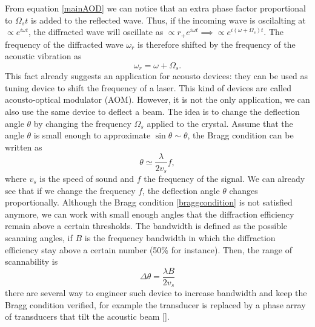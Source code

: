 From equation \eqref{mainAOD} we can notice that an extra phase factor proportional to $\Omega_s t$ is added to the reflected wave. Thus, if the incoming wave is oscilalting at $\propto e^{i\omega t}$, the diffracted wave will oscillate as $\propto r_{+}e^{i\omega t} \implies \propto e^{i(\omega + \Omega_s )t}$. The frequency of the diffracted wave $\omega_r$ is therefore shifted by the frequency of the acoustic vibration as
\begin{equation}
\omega_r  =  \omega + \Omega_s.
\end{equation}
This fact already suggests an application for acousto devices: they can be used as tuning device to shift the frequency of a laser. This kind of devices are called acousto-optical modulator (AOM). However, it is not the only application, we can also use the same device to deflect a beam. The idea is to change the deflection angle $\theta$ by changing the frequency $\Omega_s$ applied to the crystal.
Assume that the angle $\theta$ is small enough to approximate $\sin\theta \sim \theta$, the Bragg condition can be written as
\begin{equation}
\theta \simeq \frac{\lambda}{2 v_s}f,
\end{equation}
where $v_s$ is the speed of sound and $f$ the frequency of the signal. We can already see that if we change the frequency $f$, the deflection angle $\theta$ changes proportionally. Although the Bragg condition \eqref{braggcondition} is not satisfied anymore, we can work with small enough angles that the diffraction efficiency remain above a certain thresholds. The bandwidth is defined as the possible scanning angles, if $B$ is the frequency bandwidth in which the diffraction efficiency stay above a certain number (50\% for instance). Then, the range of scannability is
\begin{equation}
\Delta\theta = \frac{\lambda B}{2v_s}
\end{equation}
there are several way to engineer such device to increase bandwidth and keep the Bragg condition verified, for example the transducer is replaced by a phase array of transducers that tilt the acoustic beam [].

